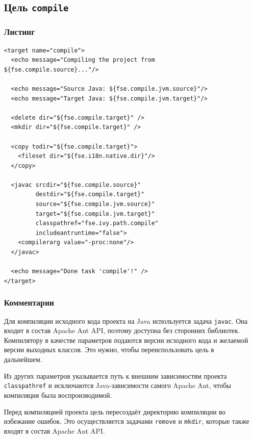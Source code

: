\subsection{Цель \texttt{compile}}

\subsubsection{Листинг}

\begin{lstlisting}[caption={Часть содержимого файла \texttt{build.xml}},captionpos=b]
<target name="compile">
  <echo message="Compiling the project from ${fse.compile.source}..."/>

  <echo message="Source Java: ${fse.compile.jvm.source}"/>
  <echo message="Target Java: ${fse.compile.jvm.target}"/>

  <delete dir="${fse.compile.target}" />
  <mkdir dir="${fse.compile.target}" />

  <copy todir="${fse.compile.target}">
    <fileset dir="${fse.i18n.native.dir}"/>
  </copy>

  <javac srcdir="${fse.compile.source}"
         destdir="${fse.compile.target}"
         source="${fse.compile.jvm.source}"
         target="${fse.compile.jvm.target}"
         classpathref="fse.ivy.path.compile"
         includeantruntime="false">
    <compilerarg value="-proc:none"/>
  </javac>

  <echo message="Done task 'compile'!" />
</target>
\end{lstlisting}

\subsubsection{Комментарии}

Для компиляции исходного кода проекта на Java используется задача \texttt{javac}. Она входит в состав Apache Ant API, поэтому доступна без сторонних библиотек. Компилятору в качестве параметров подаются версии исходного кода и желаемой версии выходных классов. Это нужно, чтобы переиспользовать цель в дальнейшем.

Из других параметров указывается путь к внешним зависимостям проекта \texttt{classpathref} и исключаются Java-зависимости самого Apache Ant, чтобы компиляция была воспроизводимой. 

Перед компиляцией проекта цель пересоздаёт директорию компиляции во избежание ошибок. Это осуществляется задачами \texttt{remove} и \texttt{mkdir}, которые также входят в состав Apache Ant API.

